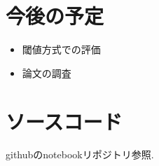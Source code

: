 \documentclass[twocolumn]{jarticle}     %
\begin{document}
\section{今後の予定}

\begin{itemize}
  \item 閾値方式での評価
  \item 論文の調査
\end{itemize}

\section{ソースコード}
githubのnotebookリポジトリ参照.



\end{document}
